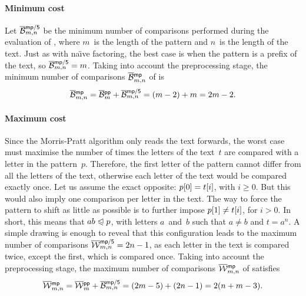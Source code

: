 \paragraph{Minimum cost} 

Let
\(\smash[t]{\OB{\fun{mp/5}}{m,n}}\)
be the minimum number of comparisons performed during the evaluation
of , where \(m\)~is the length of the pattern and \(n\)~is
the length of the text. Just as with na\"{\i}ve factoring, the best
case is when the pattern is a prefix of the text, so
\(\OB{\fun{mp/5}}{m,n} = m\). Taking into account the preprocessing
stage, the minimum number of comparisons
\(\OB{\fun{mp}}{m,n}\) of
 is
\begin{equation*}
\belowdisplayskip=0pt
\OB{\fun{mp}}{m,n} = \OB{\fun{pp}}{m} + \OB{\fun{mp/5}}{m,n} = (m-2)
+ m = 2m - 2.
\end{equation*}

\vspace*{-10pt}

\paragraph{Maximum cost}

Since the Morris\hyp{}Pratt algorithm only reads the text forwards,
the worst case must maximise the number of times the letters of the
text~\(t\) are compared with a letter in the pattern~\(p\). Therefore,
the first letter of the pattern cannot differ from all the letters of
the text, otherwise each letter of the text would be compared exactly
once. Let us assume the exact opposite: \({p}[{0}] = {t}[{i}]\),
with \(i \geqslant 0\). But this would also imply one comparison per
letter in the text. The way to force the pattern to shift as little as
possible is to further impose \({p}[{1}] \neq {t}[{i}]\), for
\(i>0\). In short, this means that \(ab \mathrel{\trianglelefteqslant} p\), with letters
\(a\)~and~\(b\) such that \(a \neq b\) and \(t=a^n\). A simple
drawing is enough to reveal that this configuration leads to the
maximum number of comparisons \(\OW{\fun{mp/5}}{m,n} = 2n -
1\), as each letter in the text is
compared twice, except the first, which is compared once. Taking into
account the preprocessing stage, the maximum number of comparisons
\(\OW{\fun{mp}}{m,n}\)  of
 satisfies
\begin{equation*}
\belowdisplayskip=0pt
\OW{\fun{mp}}{m,n} = \OW{\fun{pp}}{m} + \OB{\fun{mp/5}}{m,n} = (2m-5)
+ (2n-1) = 2(n + m - 3).
\end{equation*}

